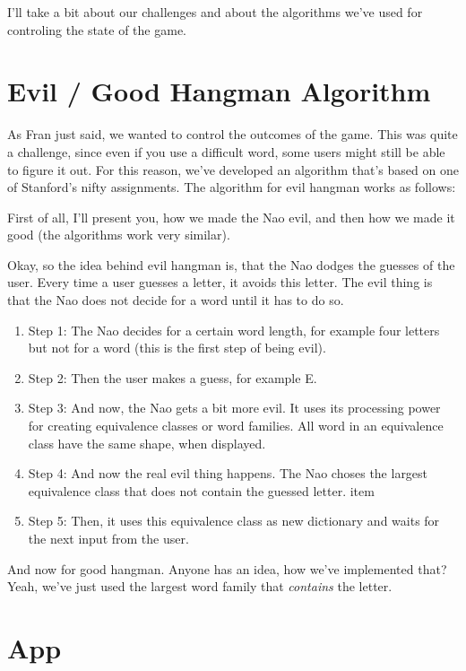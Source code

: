 \documentclass{article}
\begin{document}
I'll take a bit about our challenges and about the algorithms we've
used for controling the state of the game.

\section{Evil / Good Hangman Algorithm}

As Fran just said, we wanted to control the outcomes of the game. This
was quite a challenge, since even if you use a difficult word, some
users might still be able to figure it out. For this reason, we've
developed an algorithm that's based on one of Stanford's nifty
assignments. The algorithm for evil hangman works as follows:

First of all, I'll present you, how we made the Nao evil, and then how
we made it good (the algorithms work very similar).

Okay, so the idea behind evil hangman is, that the Nao dodges the
guesses of the user. Every time a user guesses a letter, it avoids
this letter. The evil thing is that the Nao does not decide for a word
until it has to do so.

\begin{enumerate}
\item Step 1: The Nao decides for a certain word length, for example
  four letters but not for a word (this is the first step of being evil).
\item Step 2: Then the user makes a guess, for example E.
\item Step 3: And now, the Nao gets a bit more evil. It uses its
  processing power for creating equivalence classes or word
  families. All word in an equivalence class have the same shape, when
  displayed.
\item Step 4: And now the real evil thing happens. The Nao choses the
  largest equivalence class that does not contain the guessed letter.
  item
\item Step 5: Then, it uses this equivalence class as new dictionary
  and waits for the next input from the user.
\end{enumerate}

And now for good hangman. Anyone has an idea, how we've implemented
that? Yeah, we've just used the largest word family that
\emph{contains} the letter.

\section{App}
\end{document}
